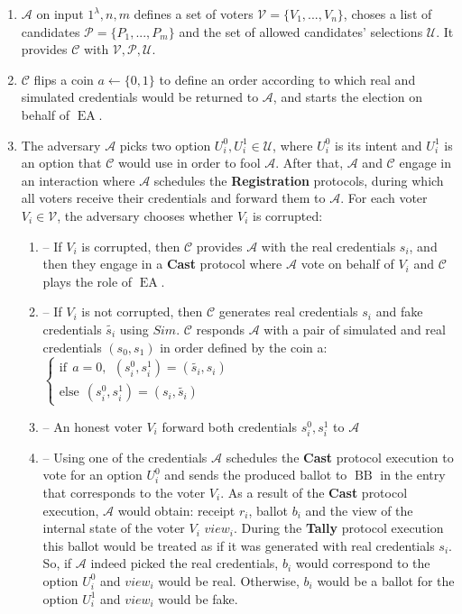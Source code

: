 \documentclass[12pt]{article}
\DeclareMathOperator{\ea}{EA}
\DeclareMathOperator{\bb}{BB}
\begin{document}
\begin{enumerate}
\item $\mathcal{A}$ on input $1^{\lambda},n,m$ defines a set of voters  $\mathcal{V} = \{V_1,...,V_n\}$, choses a list of candidates  $\mathcal{P} = \{P_1,...,P_m\}$ and the set of allowed candidates' selections $\mathcal{U}$.  It provides $\mathcal{C}$ with $\mathcal{V}, \mathcal{P}, \mathcal{U}$.
\item $\mathcal{C}$ flips a coin $a \leftarrow \{0,1\}$ to define an order according to which real and simulated credentials would be returned to $\mathcal{A}$, and starts the election on behalf of $\ea$.  
\item The adversary $\mathcal{A}$ picks two option $U^0_i,U^1_i \in \mathcal{U}$, where $U^0_i$ is its intent and $U^1_i$ is an option that $\mathcal{C}$ would use in order to fool $\mathcal{A}$.  After that, $\mathcal{A}$  and $\mathcal{C}$ engage in an interaction where $\mathcal{A}$ schedules the \textbf{Registration} protocols, during which all voters receive their credentials and forward them to  $\mathcal{A}$. For each voter $V_i \in \mathcal{V}$, the adversary chooses whether $V_i$ is corrupted:
\begin{enumerate}
\item[] -- If $V_i$ is corrupted, then $\mathcal{C}$ provides $\mathcal{A}$ with the real credentials $s_i$, and then they engage in a \textbf{Cast} protocol where $\mathcal{A}$  vote on behalf of $V_i$ and  $\mathcal{C}$ plays the role of $\ea$.
\item[] --  If $V_i$ is not corrupted, then $\mathcal{C}$ generates real credentials $s_i$ and fake credentials $\tilde{s_i}$ using $Sim$.  $\mathcal{C}$  responds  $\mathcal{A}$ with a pair of simulated and real credentials $(s_0,s_1)$ in order defined by the coin a:
$ \begin{cases}
 \text{if} ~~a =0,~~ (s^0_i,s^1_i) = (\tilde{s_i},s_i)  \\ 
 \text{else}~~  (s^0_i,s^1_i) = (s_i,\tilde{s_i})
\end{cases}$
 \item[] -- An honest voter $V_i$ forward both credentials $s^0_i,s^1_i$ to $\mathcal{A}$
\item[] -- Using one of the credentials $\mathcal{A}$ schedules the \textbf{Cast} protocol execution to vote for an option $U^0_i$ and sends the produced ballot to $\bb$ in the entry that corresponds to the voter $V_i$. As a result of the \textbf{Cast} protocol execution, $\mathcal{A}$ would obtain: receipt $r_i$, ballot $b_i$ and the view of the internal state of the voter $V_i$ $view_i$.  During the \textbf{Tally} protocol execution this ballot would be treated as if it was generated with real credentials $s_i$. So, if  $\mathcal{A}$ indeed picked the real credentials, $b_i$ would correspond to the option   $U^0_i$  and $view_i$ would be real. Otherwise, $b_i$ would be a ballot for the option  $U^1_i$ and $view_i$ would be fake. 

\end{enumerate}
\end{enumerate}
\end{document}
